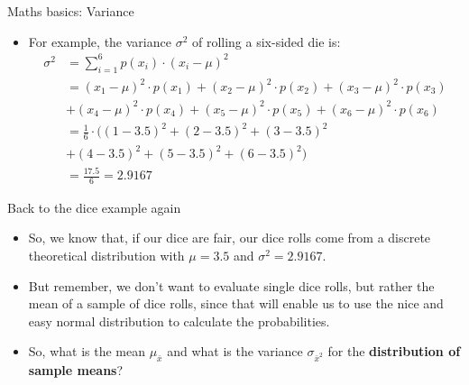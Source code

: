 \begin{frame}{Maths basics: Variance}

\begin{itemize}
\itemsep1pt\parskip0pt
\item
  For example, the variance \(\sigma^2\) of rolling a six-sided die is:
  \[
  \begin{aligned}
  \sigma^2 &= \sum\limits_{i=1}^6 p(x_i)\cdot (x_i - \mu)^2 \\
  &= (x_1-\mu)^2 \cdot p(x_1) + (x_2-\mu)^2 \cdot p(x_2) + (x_3-\mu)^2 \cdot p(x_3) \\
  &+ (x_4-\mu)^2 \cdot p(x_4) + (x_5-\mu)^2 \cdot p(x_5) + (x_6-\mu)^2 \cdot p(x_6) \\
  &= \frac{1}{6}\cdot \Big((1-3.5)^2 + (2-3.5)^2 + (3-3.5)^2 \\
  &+ (4-3.5)^2 + (5-3.5)^2+ (6-3.5)^2\Big) \\
  &= \frac{17.5}{6} = 2.9167
  \end{aligned}
  \]
\end{itemize}

\end{frame}

\begin{frame}{Back to the dice example again}

\begin{itemize}
\itemsep1pt\parskip0pt
\item
  So, we know that, if our dice are fair, our dice rolls come from a
  discrete theoretical distribution with \(\mu = 3.5\) and
  \(\sigma^2 = 2.9167\).
\item
  But remember, we don't want to evaluate single dice rolls, but rather
  the mean of a sample of dice rolls, since that will enable us to use
  the nice and easy normal distribution to calculate the probabilities.
\item
  So, what is the mean \(\mu_{\bar{x}}\) and what is the variance
  \(\sigma_{\bar{x}^2}\) for the \textbf{distribution of sample means}?
\end{itemize}

\end{frame}

